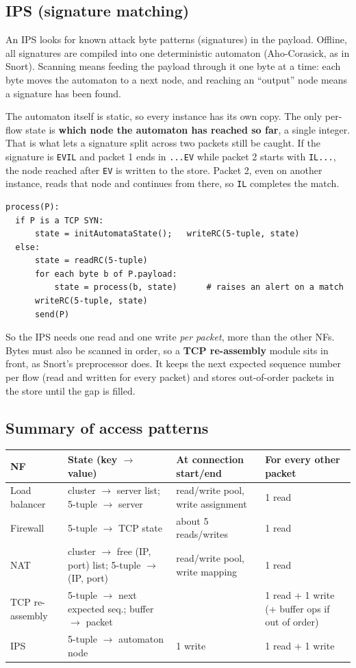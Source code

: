 \subsection{IPS (signature matching)}
An IPS looks for known attack byte patterns (signatures) in the payload. Offline, all signatures are compiled into one deterministic
automaton (Aho-Corasick, as in Snort). Scanning means feeding the payload through it one byte at a time: each byte moves the automaton to
a next node, and reaching an ``output'' node means a signature has been found.

The automaton itself is static, so every instance has its own copy. The only per-flow state is \textbf{which node the automaton has
reached so far}, a single integer. That is what lets a signature split across two packets still be caught. If the signature is
\texttt{EVIL} and packet 1 ends in \texttt{...EV} while packet 2 starts with \texttt{IL...}, the node reached after \texttt{EV} is written to
the store. Packet 2, even on another instance, reads that node and continues from there, so \texttt{IL} completes the match.

\begin{lstlisting}
process(P):
  if P is a TCP SYN:
      state = initAutomataState();   writeRC(5-tuple, state)
  else:
      state = readRC(5-tuple)
      for each byte b of P.payload:
          state = process(b, state)      # raises an alert on a match
      writeRC(5-tuple, state)
      send(P)
\end{lstlisting}
So the IPS needs one read and one write \emph{per packet}, more than the other NFs. Bytes must also be scanned in order, so a \textbf{TCP
re-assembly} module sits in front, as Snort's preprocessor does. It keeps the next expected sequence number per flow (read and written for
every packet) and stores out-of-order packets in the store until the gap is filled.

\subsection{Summary of access patterns}
\begin{center}
\small
\begin{tabularx}{\linewidth}{@{}lllX@{}}
\toprule
NF & State (key $\to$ value) & At connection start/end & For every other packet\\
\midrule
Load balancer & cluster $\to$ server list; 5-tuple $\to$ server & read/write pool, write assignment & 1 read\\
Firewall & 5-tuple $\to$ TCP state & about 5 reads/writes & 1 read\\
NAT & cluster $\to$ free (IP, port) list; 5-tuple $\to$ (IP, port) & read/write pool, write mapping & 1 read\\
TCP re-assembly & 5-tuple $\to$ next expected seq.; buffer $\to$ packet & & 1 read + 1 write (+ buffer ops if out of order)\\
IPS & 5-tuple $\to$ automaton node & 1 write & 1 read + 1 write\\
\bottomrule
\end{tabularx}
\end{center}

